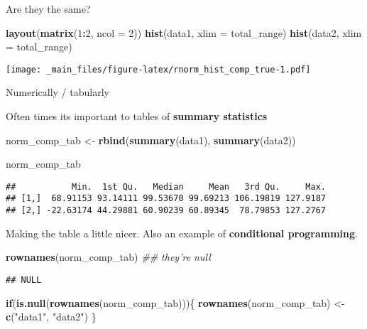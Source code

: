 \documentclass[
]{book}
\newenvironment{Shaded}{\begin{snugshade}}{\end{snugshade}}
\newcommand{\CommentTok}[1]{\textcolor[rgb]{0.56,0.35,0.01}{\textit{#1}}}
\newcommand{\ControlFlowTok}[1]{\textcolor[rgb]{0.13,0.29,0.53}{\textbf{#1}}}
\newcommand{\DataTypeTok}[1]{\textcolor[rgb]{0.13,0.29,0.53}{#1}}
\newcommand{\DecValTok}[1]{\textcolor[rgb]{0.00,0.00,0.81}{#1}}
\newcommand{\KeywordTok}[1]{\textcolor[rgb]{0.13,0.29,0.53}{\textbf{#1}}}
\newcommand{\NormalTok}[1]{#1}
\newcommand{\OperatorTok}[1]{\textcolor[rgb]{0.81,0.36,0.00}{\textbf{#1}}}
\newcommand{\StringTok}[1]{\textcolor[rgb]{0.31,0.60,0.02}{#1}}
\begin{document}
Are they the same?

\begin{Shaded}
\begin{Highlighting}[]
\KeywordTok{layout}\NormalTok{(}\KeywordTok{matrix}\NormalTok{(}\DecValTok{1}\OperatorTok{:}\DecValTok{2}\NormalTok{, }\DataTypeTok{ncol =} \DecValTok{2}\NormalTok{))}
\KeywordTok{hist}\NormalTok{(data1, }\DataTypeTok{xlim =}\NormalTok{ total_range)}
\KeywordTok{hist}\NormalTok{(data2, }\DataTypeTok{xlim =}\NormalTok{ total_range)}
\end{Highlighting}
\end{Shaded}

\texttt{[image: \_main\_files/figure-latex/rnorm\_hist\_comp\_true-1.pdf]}

Numerically / tabularly

Often times its important to tables of \textbf{summary statistics}

\begin{Shaded}
\begin{Highlighting}[]
\NormalTok{norm_comp_tab <-}\StringTok{ }\KeywordTok{rbind}\NormalTok{(}\KeywordTok{summary}\NormalTok{(data1),}
                       \KeywordTok{summary}\NormalTok{(data2))}

\NormalTok{norm_comp_tab}
\end{Highlighting}
\end{Shaded}

\begin{verbatim}
##           Min.  1st Qu.   Median     Mean   3rd Qu.     Max.
## [1,]  68.91153 93.14111 99.53670 99.69213 106.19819 127.9187
## [2,] -22.63174 44.29881 60.90239 60.89345  78.79853 127.2767
\end{verbatim}

Making the table a little nicer. Also an example of \textbf{conditional programming}.

\begin{Shaded}
\begin{Highlighting}[]
\KeywordTok{rownames}\NormalTok{(norm_comp_tab) }\CommentTok{## they're null}
\end{Highlighting}
\end{Shaded}

\begin{verbatim}
## NULL
\end{verbatim}

\begin{Shaded}
\begin{Highlighting}[]
\ControlFlowTok{if}\NormalTok{(}\KeywordTok{is.null}\NormalTok{(}\KeywordTok{rownames}\NormalTok{(norm_comp_tab)))\{}
  \KeywordTok{rownames}\NormalTok{(norm_comp_tab) <-}\StringTok{ }\KeywordTok{c}\NormalTok{(}\StringTok{"data1"}\NormalTok{, }\StringTok{"data2"}\NormalTok{)}
\NormalTok{\}}
\end{Highlighting}
\end{Shaded}
\end{document}
